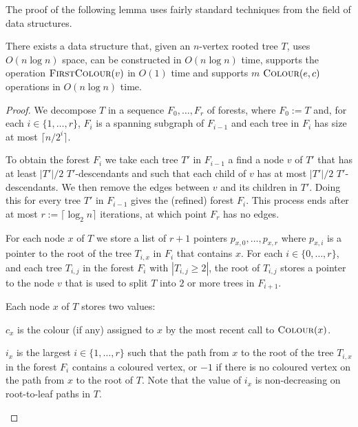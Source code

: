 \documentclass[kpfonts]{patmorin}
\let\ge\geqslant
\begin{document}
The proof of the following lemma uses fairly standard techniques from the field of data structures.

\begin{lem}
  There exists a data structure that, given an $n$-vertex rooted tree $T$, uses $O(n\log n)$ space, can be constructed in $O(n\log n)$ time, supports the operation $\textsc{FirstColour}(v)$ in $O(1)$ time and supports $m$ $\textsc{Colour}(e,c)$ operations in $O(n\log n)$ time.
\end{lem}

\begin{proof}
    We decompose $T$ in a sequence $F_0,\ldots,F_r$ of forests, where $F_0:=T$ and, for each $i\in\{1,\ldots,r\}$, $F_i$ is a spanning subgraph of $F_{i-1}$ and each tree in $F_i$ has size at most $\lceil n/2^i\rceil$.

    To obtain the forest $F_i$ we take each tree $T'$ in $F_{i-1}$
    a find a node $v$ of $T'$ that has at least $|T'|/2$ $T'$-descendants and such that each child of $v$ has at most $|T'|/2$ $T'$-descendants.  We then remove the edges between $v$ and its children in $T'$.  Doing this for every tree $T'$ in $F_{i-1}$ gives the (refined) forest $F_i$.  This process ends after at most $r:=\lceil\log_2 n\rceil$ iterations, at which point $F_r$ has no edges.

    For each node $x$ of $T$ we store a list of $r+1$ pointers $p_{x,0},\ldots,p_{x,r}$ where $p_{x,i}$ is a pointer to the root of the tree $T_{i,x}$ in $F_i$ that contains $x$.  For each $i\in\{0,\ldots,r\}$, and each tree $T_{i,j}$ in the forest $F_i$ with $|T_{i,j}\ge 2|$, the root of $T_{i,j}$ stores a pointer to the node $v$ that is used to split $T$ into $2$ or more trees in $F_{i+1}$.

    Each node $x$ of $T$ stores two values:
    \begin{compactenum}
      \item $c_x$ is the colour (if any) assigned to $x$ by the most recent call to $\textsc{Colour}(x)$.
      \item $i_x$ is the largest $i\in\{1,\ldots,r\}$ such that the path from $x$ to the root of the tree $T_{i,x}$ in the forest $F_i$ contains a coloured vertex, or $-1$ if there is no coloured vertex on the path from $x$ to the root of $T$.  Note that the value of $i_x$ is non-decreasing on root-to-leaf paths in $T$.
    \end{compactenum}


\end{proof}
\end{document}
